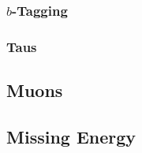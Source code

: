 \subsubsection{$b$-Tagging}
\label{sec:ATLAS:btagging}

\subsubsection{Taus}
\label{sec:ATLAS:taus}

\subsection{Muons}
\label{sec:ATLAS:muons}

\subsection{Missing Energy}
\label{sec:ATLAS:met}
